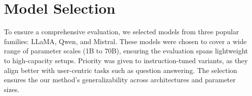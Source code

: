 \section{Model Selection} 
\label{app:models}
To ensure a comprehensive evaluation, we selected models from three popular families: LLaMA, Qwen, and Mistral. These models were chosen to cover a wide range of parameter scales (1B to 70B), ensuring the evaluation spans lightweight to high-capacity setups. Priority was given to instruction-tuned variants, as they align better with user-centric tasks such as question answering. The selection ensures the our method’s generalizability across architectures and parameter sizes. 
